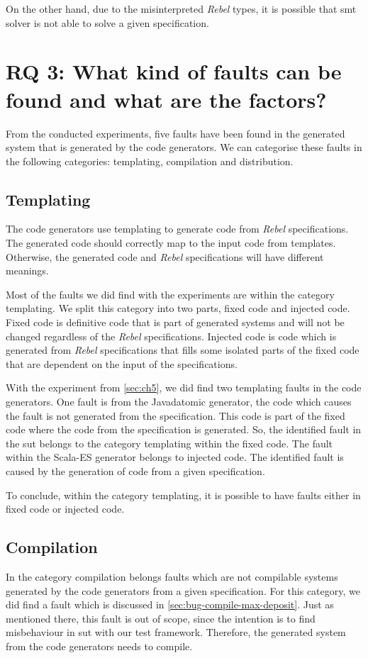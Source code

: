On the other hand, due to the misinterpreted \textit{Rebel} types, it is
possible that \gls{smt} solver is not able to solve a given specification.

\section{RQ 3: What kind of faults can be found and what are the factors?}

From the conducted experiments, five faults have been found in the
generated system that is generated by the code generators. We can categorise
these faults in the following categories: templating, compilation and
distribution.

\subsection{Templating}
The code generators use templating to generate code from \textit{Rebel}
specifications. The generated code should correctly map to the input code from
templates. Otherwise, the generated code and \textit{Rebel} specifications will
have different meanings.

Most of the faults we did find with the experiments are within the category
templating. We split this category into two parts, fixed code and injected code.
Fixed code is definitive code that is part of generated systems and will not be
changed regardless of the \textit{Rebel} specifications.
Injected code is code which is generated from \textit{Rebel} specifications that
fills some isolated parts of the fixed code that are dependent on the input of
the specifications.

With the experiment from \autoref{sec:ch5}, we did find two templating faults in the code
generators. One fault is from the Javadatomic generator, the code which causes the
fault is not generated from the specification. This code is part of the fixed code
where the code from the specification is generated. So, the identified fault in
the \gls{sut} belongs to the category templating within the fixed code.
The fault within the Scala-ES generator belongs to injected code. The identified fault is
caused by the generation of code from a given specification.

To conclude, within
the category templating, it is possible to have faults either in fixed code or
injected code.

\subsection{Compilation}
In the category compilation belongs faults which are not compilable systems
generated by the code generators from a given specification. For this category,
we did find a fault which is discussed in \autoref{sec:bug-compile-max-deposit}.
Just as mentioned there, this fault is out of scope, since the intention is to
find misbehaviour in \gls{sut} with our test framework.
Therefore, the generated system from the code generators needs to compile.


